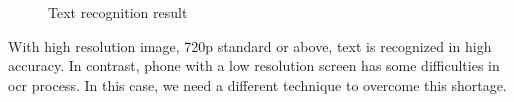 \begin{figure}[H]
{	    }
	    \qquad
	    \qquad
	    \caption{Text recognition result}
		\label{fig:text_recognize}
	\end{figure}

With high resolution image, 720p standard or above, text is recognized in high accuracy. In contrast, phone with a low resolution screen has some difficulties in \acrshort{ocr} process. In this case, we need a different technique to overcome this shortage.